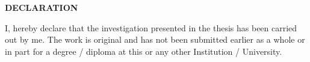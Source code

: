 \thispagestyle{plain}
\doublespacing
\centerline{{\bf{\large{DECLARATION}}}}
\vskip 1.2cm

I, hereby declare that the investigation presented in the thesis has been
carried out by me. The work is original and has not been submitted
earlier as a whole or in part for a degree / diploma at this or any
other Institution / University.

\vskip 4.0cm



